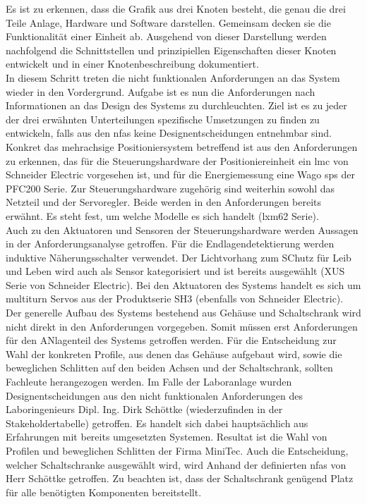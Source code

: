 \documentclass[../Bachelorarbeit.tex]{subfiles}
\begin{document}
Es ist zu erkennen, dass die Grafik aus drei Knoten besteht, die genau die drei Teile Anlage, Hardware und Software darstellen. Gemeinsam decken sie die Funktionalität einer Einheit ab. Ausgehend von dieser Darstellung werden nachfolgend die Schnittstellen und prinzipiellen Eigenschaften dieser Knoten entwickelt und in einer Knotenbeschreibung dokumentiert. \\ %
In diesem Schritt treten die nicht funktionalen Anforderungen an das System wieder in den Vordergrund. Aufgabe ist es nun die Anforderungen nach Informationen an das Design des Systems zu durchleuchten. Ziel ist es zu jeder der drei erwähnten Unterteilungen spezifische Umsetzungen zu finden \bzw zu entwickeln, falls aus den \acp{nfa} keine Designentscheidungen entnehmbar sind. \\
Konkret das mehrachsige Positioniersystem betreffend ist aus den Anforderungen zu erkennen, das für die Steuerungshardware der Positioniereinheit ein \ac{lmc} von Schneider Electric vorgesehen ist, und für die Energiemessung eine Wago \ac{sps} der PFC200 Serie. Zur Steuerungshardware zugehörig sind weiterhin sowohl das Netzteil und der Servoregler. Beide werden in den Anforderungen bereits erwähnt. Es steht fest, um welche Modelle es sich handelt (\acs{lxm}62 Serie).\\ 
Auch zu den Aktuatoren und Sensoren der Steuerungshardware werden Aussagen in der Anforderungsanalyse getroffen. Für die Endlagendetektierung werden induktive Näherungsschalter verwendet. Der Lichtvorhang zum SChutz für Leib und Leben wird auch als Sensor kategorisiert und ist bereits ausgewählt (XUS Serie von Schneider Electric). Bei den Aktuatoren des Systems handelt es sich um multiturn Servos aus der Produktserie SH3 (ebenfalls von Schneider Electric). \\
Der generelle Aufbau des Systems bestehend aus Gehäuse und Schaltschrank wird nicht direkt in den Anforderungen vorgegeben. Somit müssen erst Anforderungen für den ANlagenteil des Systems getroffen werden. Für die Entscheidung zur Wahl der konkreten Profile, aus denen das Gehäuse aufgebaut wird, sowie die beweglichen Schlitten auf den beiden Achsen und der Schaltschrank, sollten Fachleute herangezogen werden. Im Falle der Laboranlage wurden Designentscheidungen aus den nicht funktionalen Anforderungen des Laboringenieurs Dipl. Ing. Dirk Schöttke (wiederzufinden in der Stakeholdertabelle) getroffen. Es handelt sich dabei hauptsächlich aus Erfahrungen mit bereits umgesetzten Systemen. Resultat ist die Wahl von Profilen und beweglichen Schlitten der Firma MiniTec. Auch die Entscheidung, welcher Schaltschranke ausgewählt wird, wird Anhand der definierten \acp{nfa} von Herr Schöttke getroffen. Zu beachten ist, dass der Schaltschrank genügend Platz für alle benötigten Komponenten bereitstellt.\\
\end{document}
